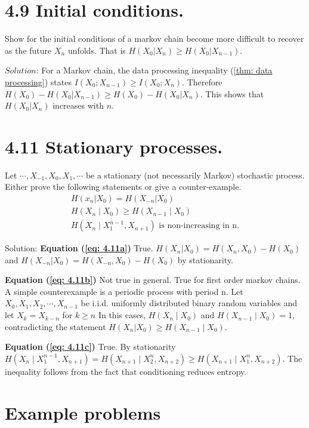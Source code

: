 \documentclass[10pt]{article}
\newcommand{\pref}[1]{{(\ref{#1})}}
\begin{document}
\begin{tiny}
\begin{multicols}{3}
\section*{4.9 Initial conditions.}
Show for the initial conditions of a markov chain become more difficult to
recover as the future $X_n$ unfolds. That is $H (X_0|X_n) \ge H (X_0|X_{n-1})$.

$Solution$: For a Markov chain, the data processing inequality
\pref{thm: data processing} states $I(X_0  ; X_{n-1}) \ge I(X_0 ; X_n)$. 
Therefore $H(X_0) - H(X_0 | X_{n-1}) \ge H(X_0) - H(X_0 | X_n)$. This
shows that $H(X_0|X_n)$ increases with $n$.

\section*{4.11 Stationary processes.}
Let	$\cdots, X_{-1}, X_0, X_1, \cdots$ be	a stationary (not necessarily
Markov) stochastic process. Either prove the following statements or give
a counter-example.
\begin{eqnarray}
    H(x_n | X_0) = H(X_{-n} | X_0) \label{eq: 4.11a}\\
    H(X_n\mid X_0) \ge H(X_{n-1} \mid X_0) \label{eq: 4.11b}\\
    H(X_n \mid X_1^{n-1}, X_{n+1}) \text{ is non-increasing in n.} \label{eq: 4.11c}
\end{eqnarray}

Solution: \textbf{Equation \pref{eq: 4.11a}} True. $H(X_n | X_0) = H(X_n,X_0) - H(X_0)$ and $H(X_{-n} | X_0) = H(X_{-n},X_0) - H(X_0)$ by stationarity.

\textbf{Equation \pref{eq: 4.11b}} Not true in general. True for first order markov chains. A simple counterexample is a periodic process with period n. Let $X_0,X_1,X_2,\cdots,X_{n-1}$ be i.i.d. uniformly distributed binary random variables and let \(X_k =X_{k-n}\) for \( k \ge n \) In this cases, $H(X_n \mid X_0)$ and $H(X_{n-1} \mid X_0) = 1$, contradicting the statement $H(X_n | X_0) \ge H(X_{n-1} \mid X_0)$.

\textbf{Equation \pref{eq: 4.11c}} True. By stationarity 
\(H(X_n \mid X_1^{n-1}, X_{n+1}) 
= H(X_{n+1} \mid X_2^{n}, X_{n+2}) 
\ge H(X_{n+1} \mid X_1^{n}, X_{n+2}) \). The inequality follows from the fact that conditioning reduces entropy.

\section*{Example problems}


\end{multicols}
\end{tiny}
\end{document}
